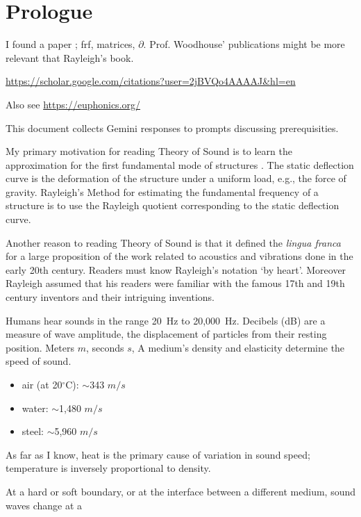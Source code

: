 \section{Prologue}\label{prologue}

I found a paper \cite{Woodhouse2024}; frf, matrices, \(\partial\).
Prof. Woodhouse' publications might be more relevant that Rayleigh's book.

\url{https://scholar.google.com/citations?user=2jBVQo4AAAAJ&hl=en}

Also see \url{https://euphonics.org/}



This document collects Gemini responses to prompts discussing prerequisities.

My primary motivation for reading Theory of Sound is to learn the
approximation for the first fundamental mode of structures \cite{Hodges1985}.
The static deflection curve is the deformation of the structure under a uniform
load, e.g., the force of gravity. Rayleigh's Method for estimating the
fundamental frequency of a structure is to use the Rayleigh quotient
corresponding to the static deflection curve.

Another reason to reading Theory of Sound is that it defined the
\emph{lingua franca} for a large proposition of the work related to
acoustics and vibrations done in the early 20th century. Readers must
know Rayleigh's notation `by heart'. Moreover Rayleigh assumed that his
readers were familiar with the famous 17th and 19th century inventors
and their intriguing inventions.

Humans hear sounds in the range 20~Hz to 20,000~Hz. Decibels (dB) are a
measure of wave amplitude, the displacement of particles from their
resting position. Meters \(m\), seconds \(s\), A medium's density and
elasticity determine the speed of sound.

\begin{itemize}
\item
  air (at 20\(^\circ \)C): \(\sim \)343 \(m/s\)
\item
  water: \(\sim \)1,480 \(m/s\)
\item
  steel: \(\sim \)5,960 \(m/s\)
\end{itemize}

As far as I know, heat is the primary cause of variation in sound speed;
temperature is inversely proportional to density.

At a hard or soft boundary, or at the interface between a different
medium, sound waves change at a

